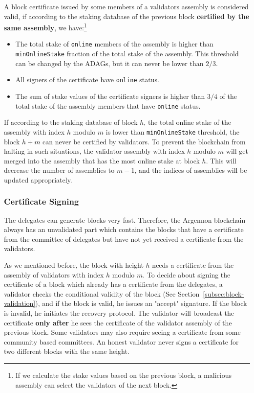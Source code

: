 A block certificate issued by some members of a validators assembly is considered valid, if according to
the staking database of the previous block \textbf{certified by the same assembly}, we have:\footnote{If we calculate
the stake values based on the previous block, a malicious assembly can select the validators of the next block.}
\begin{itemize}
    \item The total stake of \texttt{online} members of the assembly is higher than \texttt{minOnlineStake} fraction
    of the total stake of the assembly. This threshold can be changed by the ADAGs, but it can never be lower
    than $2/3$.
    \item All signers of the certificate have \texttt{online} status.
    \item The sum of stake values of the certificate signers is higher than $3/4$ of the total stake
    of the assembly members that have \texttt{online} status.
\end{itemize}

If according to the staking database of block $h$, the total online stake of the assembly with index $h$ modulo $m$ is
lower than \texttt{minOnlineStake} threshold, the block $h + m$ can never be certified by validators. To prevent the
blockchain from halting in such situations, the validator assembly with index $h$ modulo $m$ will get merged into the
assembly that has the most online stake at block $h$. This will decrease the number of assemblies to $m-1$, and the
indices of assemblies will be updated appropriately.

\subsubsection{Certificate Signing}

The delegates can generate blocks very fast. Therefore, the Argennon blockchain always has an
unvalidated part which contains the blocks that have a certificate from the committee of delegates but have not
yet received a certificate from the validators.

As we mentioned before, the block with height $h$ needs a certificate from the assembly of
validators with index $h$ modulo $m$. To decide about signing the certificate of a block which already has
a certificate from the delegates, a validator checks the conditional
validity of the block (See Section~\ref{subsec:block-validation}), and if the block is valid, he issues
an "accept" signature. If the block is invalid, he initiates the recovery protocol. The validator will broadcast the
certificate \textbf{only after} he sees the certificate of the validator assembly of the previous block.
Some validators may also require seeing a certificate from
some community based committees. An honest validator never signs a certificate for two different blocks with the
same height.

